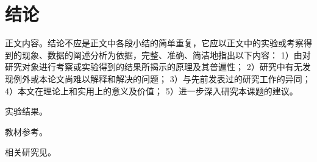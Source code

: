 \documentclass[a4paper, zihao=5, UTF8, AutoFakeBold, AutoFakeSlant]{ctexart}
\numberwithin{equation}{section}
\numberwithin{figure}{section}
\numberwithin{table}{section}
\begin{document}
\section{结论}
正文内容。结论不应是正文中各段小结的简单重复，它应以正文中的实验或考察得到的现象、数据的阐述分析为依据，完整、准确、简洁地指出以下内容：
1）由对研究对象进行考察或实验得到的结果所揭示的原理及其普遍性；
2）研究中有无发现例外或本论文尚难以解释和解决的问题；
3）与先前发表过的研究工作的异同；
4）本文在理论上和实用上的意义及价值；
5）进一步深入研究本课题的建议。

实验结果\cite{paper1}。

教材参考\cite{book1}。

相关研究见\cite{thesis1}。

\balance  %
\vspace{-6pt}
\printbibliography
[
	heading=bibliography,
	title={参考文献}
]
\end{document}
